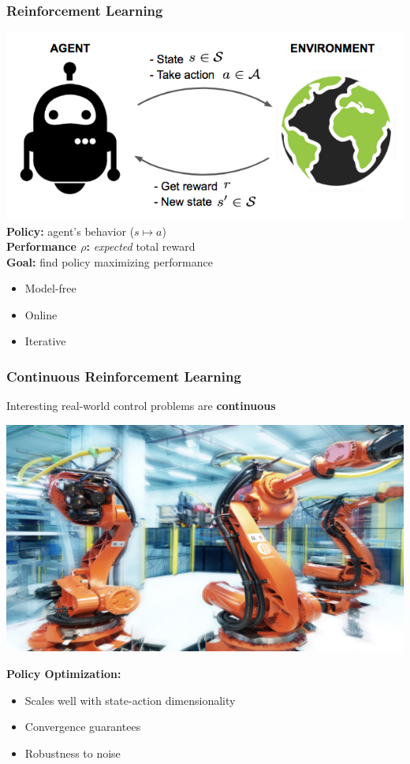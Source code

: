 \documentclass{beamer}
\begin{document}
\begin{frame}
\frametitle{Reinforcement Learning}
\centering
\includegraphics[width=.75\textwidth]{pics/rl2.png}\\
\vspace{.5cm}
{\bf Policy:} agent's behavior ($s\mapsto a$) \\
{\bf Performance $\rho$:} \emph{expected} total reward \\
{\bf Goal:} find policy maximizing performance
\vspace{.25cm}
\begin{itemize}
	\item Model-free
	\item Online
	\item Iterative
\end{itemize}
\end{frame}

\begin{frame}
\frametitle{Continuous Reinforcement Learning}
Interesting real-world control problems are \textbf{continuous}
\begin{center}
\includegraphics[width=.5\textwidth]{pics/robots.jpg}
\end{center}
\textbf{Policy Optimization:}
\begin{itemize}
	\item Scales well with state-action dimensionality
	\item Convergence guarantees
	\item Robustness to noise
\end{itemize}
\end{frame}
\end{document}
